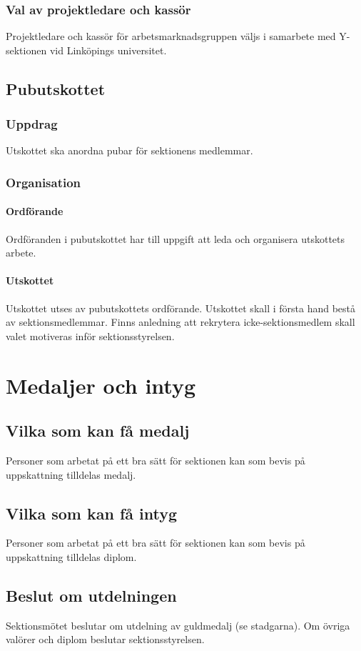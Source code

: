 \documentclass{datateknologsektionen-document}
\begin{document}
\subsubsection{Val av projektledare och kassör}
Projektledare och kassör för arbetsmarknadsgruppen väljs i samarbete med Y-sektionen vid
Linköpings universitet.

\subsection{Pubutskottet}
\label{pubu}
\subsubsection{Uppdrag}
Utskottet ska anordna pubar för sektionens medlemmar.
\subsubsection{Organisation}
\paragraph{Ordförande}
Ordföranden i pubutskottet har till uppgift att leda och organisera utskottets arbete.
\paragraph{Utskottet}
Utskottet utses av pubutskottets ordförande. Utskottet skall i första hand bestå av
sektionsmedlemmar. Finns anledning att rekrytera icke-sektionsmedlem skall valet
motiveras inför sektionsstyrelsen.
\section{Medaljer och intyg}
\subsection{Vilka som kan få medalj}
Personer som arbetat på ett bra sätt för sektionen kan som bevis på uppskattning tilldelas medalj.
\subsection{Vilka som kan få intyg}
Personer som arbetat på ett bra sätt för sektionen kan som bevis på uppskattning tilldelas diplom.
\subsection{Beslut om utdelningen}
Sektionsmötet beslutar om utdelning av guldmedalj (se stadgarna). Om övriga valörer och diplom
beslutar sektionsstyrelsen.
\end{document}

